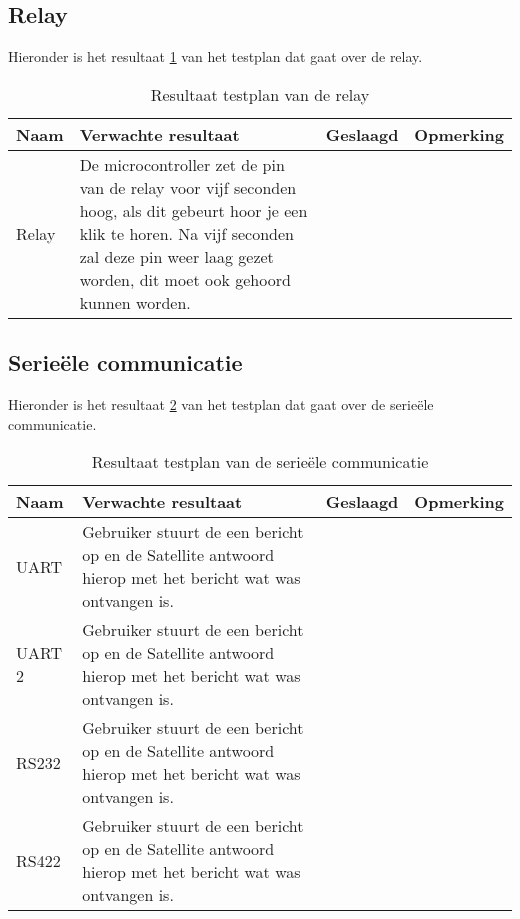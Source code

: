 \newpage
\subsection{Relay}
Hieronder is het resultaat \ref{tab:resultaatrelay}  van het testplan dat gaat over de relay.
\begin{table}[h!]
	\caption{Resultaat testplan van de relay}
	\begin{tabular}{lp{8.5cm}lp{4cm}}
	\toprule
	\textbf{Naam} 	& \textbf{Verwachte resultaat} & \textbf{Geslaagd} & \textbf{Opmerking} \\ \toprule
	Relay			& De microcontroller zet de pin van de relay voor vijf seconden hoog, als dit gebeurt hoor je een klik te horen. Na vijf seconden zal deze pin weer laag gezet worden, dit moet ook gehoord kunnen worden.\\  \bottomrule
	\end{tabular}
	\label{tab:resultaatrelay}
\end{table}


\subsection{Serieële communicatie}
Hieronder is het resultaat \ref{tab:resultaatserieel} van het testplan dat gaat over de serieële communicatie.
\begin{table}[h!]
	\caption{Resultaat testplan van de serieële communicatie}
	\begin{tabular}{lp{8.5cm}lp{4cm}}
	\toprule
	\textbf{Naam} 	& \textbf{Verwachte resultaat} & \textbf{Geslaagd} & \textbf{Opmerking} \\ \toprule
	UART & Gebruiker stuurt de een bericht op en de Satellite antwoord hierop met het bericht wat was ontvangen is.&& \\
	UART 2 & Gebruiker stuurt de een bericht op en de Satellite antwoord hierop met het bericht wat was ontvangen is.&& \\
	RS232 & Gebruiker stuurt de een bericht op en de Satellite antwoord hierop met het bericht wat was ontvangen is.&&\\
	RS422 & Gebruiker stuurt de een bericht op en de Satellite antwoord hierop met het bericht wat was ontvangen is.&&\\ \bottomrule
	\end{tabular}
	\label{tab:resultaatserieel}
\end{table}

